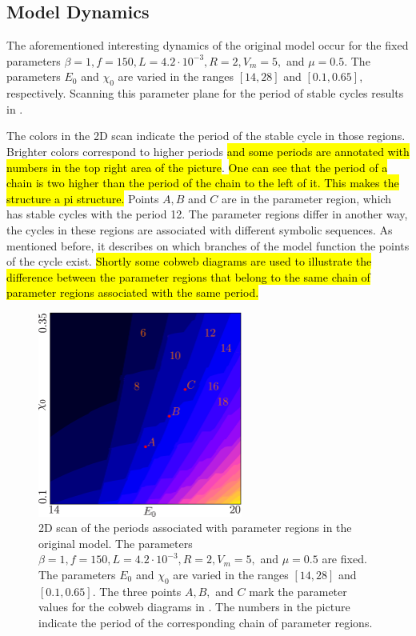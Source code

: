 \subsection{Model Dynamics}
\label{sec:state.og.dynamics}

The aforementioned interesting dynamics of the original model occur for the fixed parameters $\beta = 1, f = 150, L = 4.2 \cdot 10^{-3}, R = 2, V_m = 5,$ and $\mu = 0.5$.
The parameters $E_0$ and $\chi_0$ are varied in the ranges $[14, 28]$ and $[0.1, 0.65]$, respectively.
Scanning this parameter plane for the period of stable cycles results in .

The colors in the 2D scan  indicate the period of the stable cycle in those regions.
Brighter colors correspond to higher periods \hl{and some periods are annotated with numbers in the top right area of the picture}.
\hl{
	One can see that the period of a chain is two higher than the period of the chain to the left of it.
	This makes the structure a \gls{pi} structure.
}
Points $A, B$ and $C$ are in the parameter region, which has stable cycles with the period 12.
The parameter regions differ in another way, the cycles in these regions are associated with different symbolic sequences.
As mentioned before, it describes on which branches of the model function the points of the cycle exist.
\hl{
	Shortly some cobweb diagrams are used to illustrate the difference between the parameter regions that belong to the same chain of parameter regions associated with the same period.
}

\clearpage

\begin{figure}
	\centering
	\includegraphics[width=0.6\textwidth]{../Figures/2/2.3/result.png}
	\caption[2D scan of the periods associated with parameter regions in the original model]{
		2D scan of the periods associated with parameter regions in the original model.
		The parameters $\beta = 1, f = 150, L = 4.2 \cdot 10^{-3}, R = 2, V_m = 5,$ and $\mu = 0.5$ are fixed.
		The parameters $E_0$ and $\chi_0$ are varied in the ranges $[14, 28]$ and $[0.1, 0.65]$.
		The three points $A, B,$ and $C$ mark the parameter values for the cobweb diagrams in .
		The numbers in the picture indicate the period of the corresponding chain of parameter regions.
	}
	\label{fig:state.og.dynamics.period}
\end{figure}

